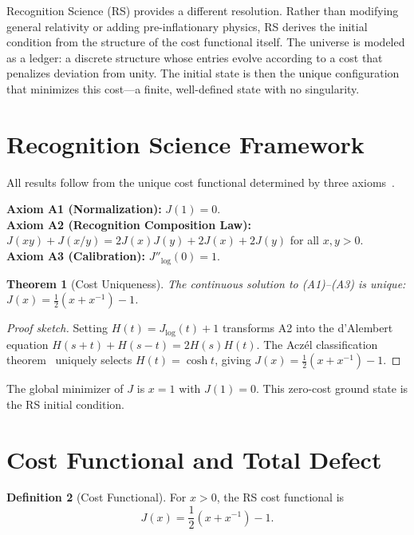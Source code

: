 \documentclass[12pt,a4paper]{article}
\newtheorem{theorem}{Theorem}[section]
\theoremstyle{definition}
\newtheorem{definition}[theorem]{Definition}
\theoremstyle{remark}
\begin{document}
Recognition Science (RS) provides a different resolution.
Rather than modifying general relativity or adding pre-inflationary physics,
RS derives the initial condition from the structure of the cost functional
itself.
The universe is modeled as a ledger: a discrete structure whose entries
evolve according to a cost that penalizes deviation from unity.
The initial state is then the unique configuration that minimizes this cost---a
finite, well-defined state with no singularity.

\section{Recognition Science Framework}
\label{sec:framework}

All results follow from the unique cost functional determined by
three axioms~\cite{RS_Axioms}.

\noindent\textbf{Axiom A1 (Normalization):} $J(1) = 0$.\\
\textbf{Axiom A2 (Recognition Composition Law):}
$J(xy)+J(x/y)=2J(x)J(y)+2J(x)+2J(y)$ for all $x,y>0$.\\
\textbf{Axiom A3 (Calibration):} $J''_{\log}(0) = 1$.

\begin{theorem}[Cost Uniqueness]
\label{thm:cost-unique}
The continuous solution to \textup{(A1)--(A3)} is unique:
$J(x) = \tfrac{1}{2}(x + x^{-1}) - 1$.
\end{theorem}

\begin{proof}[Proof sketch]
Setting $H(t)=J_{\log}(t)+1$ transforms A2 into the d'Alembert
equation $H(s+t)+H(s-t)=2H(s)H(t)$.  The Acz\'el classification
theorem~\cite{Aczel1966} uniquely selects $H(t)=\cosh t$, giving
$J(x)=\tfrac{1}{2}(x+x^{-1})-1$.
\end{proof}

\noindent The global minimizer of $J$ is $x=1$ with $J(1)=0$.
This zero-cost ground state is the RS initial condition.

\section{Cost Functional and Total Defect}

\begin{definition}[Cost Functional]
For $x > 0$, the RS cost functional is
\begin{equation}
J(x) = \frac{1}{2}\left(x + x^{-1}\right) - 1.
\end{equation}
\end{definition}
\end{document}
